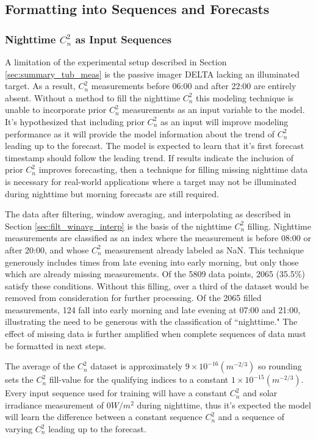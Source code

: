 \subsection{Formatting into Sequences and Forecasts}
\subsubsection{Nighttime $C_{n}^{2}$ as Input Sequences}
A limitation of the experimental setup described in Section \ref{sec:summary_tub_meas} is the passive imager DELTA lacking an illuminated target. As a result, $C_{n}^{2}$ measurements before 06:00 and after 22:00 are entirely absent. Without a method to fill the nighttime $C_{n}^{2}$ this modeling technique is unable to incorporate prior $C_{n}^{2}$ measurements as an input variable to the model. It's hypothesized that including prior $C_{n}^{2}$ as an input will improve modeling performance as it will provide the model information about the trend of $C_{n}^{2}$ leading up to the forecast. The model is expected to learn that it's first forecast timestamp should follow the leading trend. If results indicate the inclusion of prior $C_{n}^{2}$ improves forecasting, then a technique for filling missing nighttime data is necessary for real-world applications where a target may not be illuminated during nighttime but morning forecasts are still required.

The data after filtering, window averaging, and interpolating as described in Section \ref{sec:filt_winavg_interp} is the basis of the nighttime $C_{n}^{2}$ filling. Nighttime measurements are classified as an index where the measurement is before 08:00 or after 20:00, and whose $C_{n}^{2}$ measurement already labeled as NaN. This technique generously includes times from late evening into early morning, but only those which are already missing measurements. Of the 5809 data points, 2065 (35.5\%) satisfy these conditions. Without this filling, over a third of the dataset would be removed from consideration for further processing. Of the 2065 filled measurements, 124 fall into early morning and late evening at 07:00 and 21:00, illustrating the need to be generous with the classification of ``nighttime." The effect of missing data is further amplified when complete sequences of data must be formatted in next steps.

The average of the $C_{n}^{2}$ dataset is approximately $9 \times 10^{-16} (m^{-2/3})$ so rounding sets the $C_{n}^{2}$ fill-value for the qualifying indices to a constant $1 \times 10^{-15} (m^{-2/3})$. Every input sequence used for training will have a constant $C_{n}^{2}$ and solar irradiance measurement of $0 W/m^{2}$ during nighttime, thus it's expected the model will learn the difference between a constant sequence $C_{n}^{2}$ and a sequence of varying $C_{n}^{2}$ leading up to the forecast.

